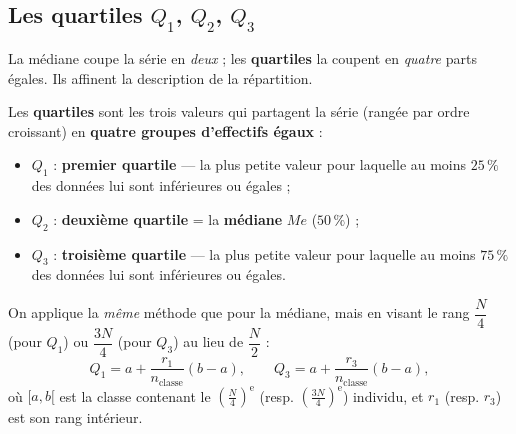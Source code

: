 \documentclass[11pt,a4paper]{article}
\newcommand{\med}{M\!e}                  %
\begin{document}
\subsection{Les quartiles $Q_1$, $Q_2$, $Q_3$}

La médiane coupe la série en \emph{deux} ; les \textbf{quartiles} la coupent en \emph{quatre} parts
égales. Ils affinent la description de la répartition.

\begin{definition}[quartiles]
Les \textbf{quartiles} sont les trois valeurs qui partagent la série (rangée par ordre croissant) en
\textbf{quatre groupes d'effectifs égaux} :
\begin{itemize}[leftmargin=1.6em,topsep=2pt,itemsep=1pt]
  \item $Q_1$ : \textbf{premier quartile} --- la plus petite valeur pour laquelle au moins
        $25\,\%$ des données lui sont inférieures ou égales ;
  \item $Q_2$ : \textbf{deuxième quartile} = la \textbf{médiane} $\med$ ($50\,\%$) ;
  \item $Q_3$ : \textbf{troisième quartile} --- la plus petite valeur pour laquelle au moins
        $75\,\%$ des données lui sont inférieures ou égales.
\end{itemize}
\end{definition}

\begin{formule}
On applique la \emph{même} méthode que pour la médiane, mais en visant le rang $\dfrac{N}{4}$ (pour
$Q_1$) ou $\dfrac{3N}{4}$ (pour $Q_3$) au lieu de $\dfrac{N}{2}$ :
\[
Q_1=a+\frac{r_1}{n_{\text{classe}}}(b-a),\qquad
Q_3=a+\frac{r_3}{n_{\text{classe}}}(b-a),
\]
où $[a,b[$ est la classe contenant le $\left(\tfrac{N}{4}\right)^{\text{e}}$ (resp.
$\left(\tfrac{3N}{4}\right)^{\text{e}}$) individu, et $r_1$ (resp. $r_3$) est son rang intérieur.
\end{formule}
\end{document}
